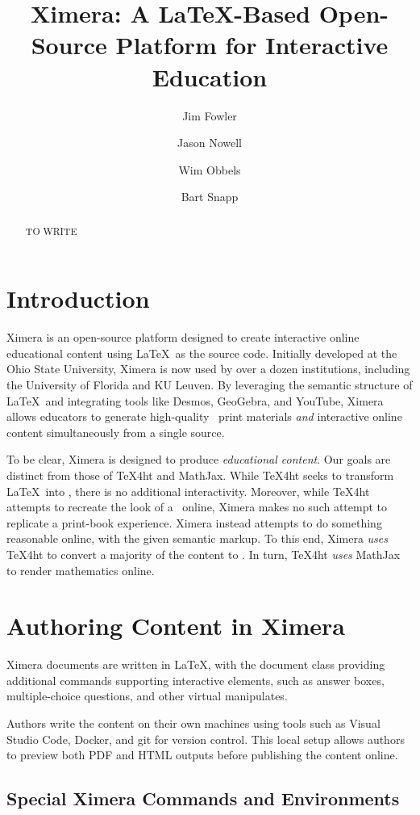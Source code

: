 \documentclass{ltugboat}
\title{Ximera: A \LaTeX{-}Based Open-Source Platform for Interactive
    Education}
\author{Jim Fowler}
\author{Jason Nowell}
\author{Wim Obbels}
\author{Bart Snapp}
\begin{document}
\maketitle

\begin{abstract}
    TO WRITE
\end{abstract}

\section{Introduction}

Ximera is an open-source platform designed to create interactive online
educational
content using \LaTeX\ as the source code. Initially developed at the Ohio State
University, Ximera is now used by over a dozen institutions, including
the University of Florida and KU Leuven. By leveraging the semantic structure
of \LaTeX\ and integrating tools like Desmos, GeoGebra, and YouTube, Ximera
allows educators to generate high-quality \PDF\ print materials \emph{and}
interactive online content simultaneously from a single source.

To be clear, Ximera is designed to produce \emph{educational content}. Our goals
are distinct from those of \TeX4ht and MathJax. While \TeX4ht seeks to
transform \LaTeX\ into \HTML, there is no additional interactivity. Moreover,
while \TeX4ht attempts to recreate the look of a \PDF\ online,
Ximera makes no such attempt to replicate a print-book experience. Ximera
instead attempts to do something reasonable
online, with the given semantic markup. To this end,
Ximera \emph{uses} \TeX4ht to convert a majority of the content to \HTML. In
turn,
\TeX4ht \emph{uses} MathJax to render mathematics online.

\section{Authoring Content in Ximera}

Ximera documents are written in \LaTeX, with the document class providing
additional
commands supporting interactive elements, such as answer boxes,
multiple-choice questions, and other virtual manipulates.

Authors write the content on their own machines using tools such as Visual
Studio Code, Docker, and git for
version control. This local setup allows authors to preview both PDF and HTML
outputs before publishing the content online.

\subsection{Special Ximera Commands and Environments}
\end{document}
